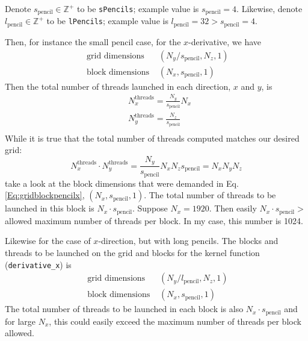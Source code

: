 \documentclass[10pt]{amsart}
\begin{document}
\begin{multicols*}{2}
Denote $s_{\text{pencil}} \in \mathbb{Z}^+$ to be \verb|sPencils|; example value is $s_{\text{pencil}} = 4$.  Likewise, denote $l_{\text{pencil}} \in \mathbb{Z}^+$ to be \verb|lPencils|; example value is $l_{\text{pencil}} = 32 > s_{\text{pencil}}=4$.  

Then, for instance the small pencil case, for the $x$-derivative, we have
\begin{equation}\label{Eq:gridblockspencilx}
\begin{aligned}
  \text{ grid dimensions } & (N_y/s_{\text{pencil}}, N_z,1) \\ 
\text{ block dimensions } &  (N_x, s_{\text{pencil}}, 1)
  \end{aligned}
\end{equation}
Then the total number of threads launched in each direction, $x$ and $y$, is
\[
\begin{aligned}
  & N_x^{\text{threads}} = \frac{N_y}{s_{\text{pencil}}} N_x \\ 
   & N_y^{\text{threads}} = \frac{N_z}{s_{\text{pencil}}}  \\ 
  \end{aligned}
\]
While it is true that the total number of threads computed matches our desired grid:
\[
N_x^{\text{threads}} \cdot N_y^{\text{threads}} = \frac{N_y}{s_{\text{pencil}}} N_x N_z s_{\text{pencil}} = N_x N_y N_z
\]
take a look at the block dimensions that were demanded in Eq. \ref{Eq:gridblockpencilx}, $(N_x,s_{\text{pencil}},1)$.  The total number of threads to be launched in this block is $N_x \cdot s_{\text{pencil}}$.  Suppose $N_x = 1920$.  Then easily $N_x\cdot s_{\text{pencil}} > $ allowed maximum number of threads per block.  In my case, this number is 1024.

Likewise for the case of $x$-direction, but with long pencils.  The blocks and threads to be launched on the grid and blocks for the kernel function (\verb|derivative_x|) is
\begin{equation}\label{Eq:gridblocklpencilx}
\begin{aligned}
  \text{ grid dimensions } & (N_y/l_{\text{pencil}}, N_z,1) \\ 
\text{ block dimensions } &  (N_x, s_{\text{pencil}}, 1)
  \end{aligned}
\end{equation}
The total number of threads to be launched in each block is also $N_x \cdot s_{\text{pencil}}$ and for large $N_x$, this could easily exceed the maximum number of threads per block allowed.


\end{multicols*}
\end{document}
